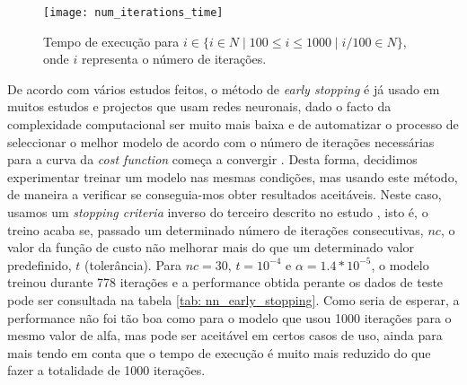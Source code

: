 \begin{figure}[!t]
\centering
\texttt{[image: num\_iterations\_time]}
\caption{Tempo de execução para $i \in \{ i \in \!N \mid 100 \leq i \leq 1000 \mid i/100 \in \!N \}$, onde $i$ representa o número de iterações.}
\label{fig:num_iterations_time}
\end{figure}
De acordo com vários estudos feitos, o método de \textit{early stopping} é já usado em muitos estudos e projectos que usam redes neuronais, dado o facto da complexidade computacional ser muito mais baixa e de automatizar o processo de seleccionar o melhor modelo de acordo com o número de iterações necessárias para a curva da \textit{cost function} começa a convergir \cite{early_stopping}.
Desta forma, decidimos experimentar treinar um modelo nas mesmas condições, mas usando este método, de maneira a verificar se conseguia-mos obter resultados aceitáveis. Neste caso, usamos um \textit{stopping criteria} inverso do terceiro descrito no estudo \cite{early_stopping}, isto é, o treino acaba se, passado um determinado número de iterações consecutivas, $nc$, o valor da função de custo não melhorar mais do que um determinado valor predefinido, $t$ (tolerância). Para $nc = 30$, $t = 10^{-4}$ e $\alpha = 1.4 * 10^{-5}$, o modelo treinou durante 778 iterações e a performance obtida perante os dados de teste pode ser consultada na tabela \ref{tab: nn_early_stopping}. Como seria de esperar, a performance não foi tão boa como para o modelo que usou 1000 iterações para o mesmo valor de alfa, mas pode ser aceitável em certos casos de uso, ainda para mais tendo em conta que o tempo de execução é muito mais reduzido do que fazer a totalidade de 1000 iterações. 


